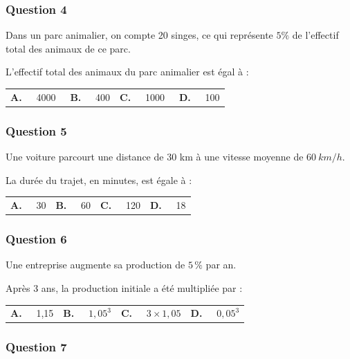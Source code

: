 \documentclass[10pt]{article}
\providecommand{\np}[2][]{{#2~#1}}
\begin{document}
\subsubsection*{Question 4}
Dans un parc animalier, on compte 20 singes, ce qui représente $5 \%$ de l'effectif total des animaux de ce parc.

L'effectif total des animaux du parc animalier est égal à :

\begin{center}
\begin{tabularx}{\linewidth}{*{4}{X}}
\textbf{A.~~} \np{4000}&\textbf{B.~~} 400&\textbf{C.~~} \np{1000}& \textbf{D.~~} 100
\end{tabularx}
\end{center}

\subsubsection*{Question 5}
Une voiture parcourt une distance de 30 km à une vitesse moyenne de $\np[km/h]{60}$.

La durée du trajet, en minutes, est égale à :

\begin{center}
\begin{tabularx}{\linewidth}{*{4}{X}}
\textbf{A.~~} 30 &\textbf{B.~~} 60&\textbf{C.~~} 120&\textbf{D.~~} 18\\
\end{tabularx}
\end{center}

\subsubsection*{Question 6}

Une entreprise augmente sa production de $5\,\%$ par an.

Après 3 ans, la production initiale a été multipliée par :

\begin{center}
\begin{tabularx}{\linewidth}{*{4}{X}}
\textbf{A.~~} 1,15 &\textbf{B.~~} $1,05^{3}$&\textbf{C.~~} $3 \times 1,05$&\textbf{D.~~} $0,05^{3}$\\
\end{tabularx}
\end{center}

\subsubsection*{Question 7}
\end{document}
